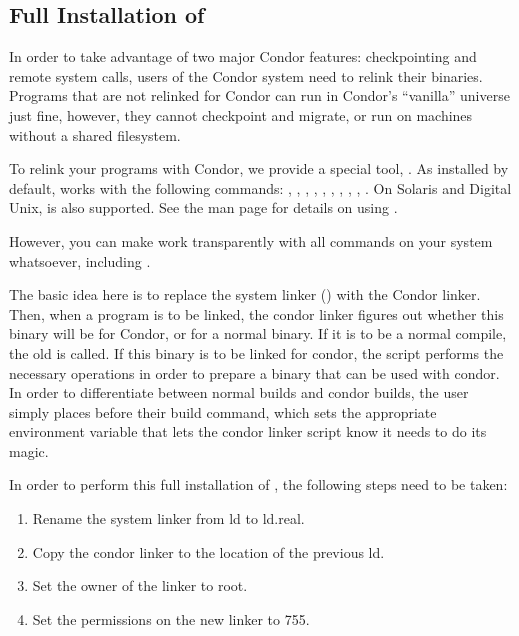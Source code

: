 \subsection{Full Installation of }
\label{sec:full-condor-compile}

In order to take advantage of two major Condor features: checkpointing
and remote system calls, users of the Condor system need to relink
their binaries.  Programs that are not relinked for Condor can run in
Condor's ``vanilla'' universe just fine, however, they cannot
checkpoint and migrate, or run on machines without a shared filesystem.

To relink your programs with Condor, we provide a special tool,
.  As installed by default,  works
with the following commands: , , ,
, , , , ,
, .  On Solaris and Digital Unix,  is
also supported.  See the  man page for details on
using .

However, you can make  work transparently with all
commands on your system whatsoever, including .  

The basic idea here is to replace the system linker () with
the Condor linker.  Then, when a program is to be linked, the condor
linker figures out whether this binary will be for Condor, or for a
normal binary.  If it is to be a normal compile, the old  is
called.  If this binary is to be linked for condor, the script
performs the necessary operations in order to prepare a binary that
can be used with condor.  In order to differentiate between normal
builds and condor builds, the user simply places 
 before their build command, which sets the
appropriate environment variable that lets the condor linker script
know it needs to do its magic.

In order to perform this full installation of , the
following steps need to be taken:
	
\begin{enumerate}
	\item Rename the system linker from ld to ld.real.
	\item Copy the condor linker to the location of the previous ld.
	\item Set the owner of the linker to root.
	\item Set the permissions on the new linker to 755.
\end{enumerate}

